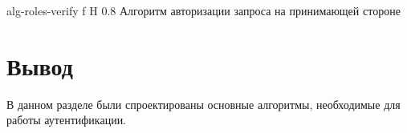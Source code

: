     {alg-roles-verify}
    {f}
    {H}
    {0.8\textwidth}
    {Алгоритм авторизации запроса на принимающей стороне}


%
%

\section*{Вывод}
В данном разделе были спроектированы основные алгоритмы, необходимые для работы аутентификации.